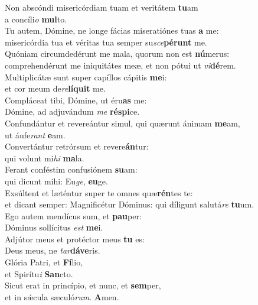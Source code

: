 \evenverse Non abscóndi misericórdiam tuam et veritátem \textbf{tu}am~\*\\
\evenverse a concíli\textit{o} \textbf{mul}to.\\
\oddverse Tu autem, Dómine, ne longe fácias miseratiónes tuas \textbf{a} me:~\*\\
\oddverse misericórdia tua et véritas tua semper su\textit{sce}\textbf{pé}\textbf{runt} me.\\
\evenverse Quóniam circumdedérunt me mala, quorum non est \textbf{nú}merus:~\*\\
\evenverse comprehendérunt me iniquitátes meæ, et non pótui ut \textit{vi}\textbf{dé}rem.\\
\oddverse Multiplicátæ sunt super capíllos cápitis \textbf{me}i:~\*\\
\oddverse et cor meum de\textit{re}\textbf{lí}\textbf{quit} me.\\
\evenverse Compláceat tibi, Dómine, ut éru\textbf{as} me:~\*\\
\evenverse Dómine, ad adjuvándum \textit{me} \textbf{ré}\textbf{spi}ce.\\
\oddverse Confundántur et revereántur simul, qui quærunt ánimam \textbf{me}am,~\*\\
\oddverse ut áufe\textit{rant} \textbf{e}am.\\
\evenverse Convertántur retrórsum et revere\textbf{án}tur:~\*\\
\evenverse qui volunt mi\textit{hi} \textbf{ma}la.\\
\oddverse Ferant conféstim confusiónem \textbf{su}am:~\*\\
\oddverse qui dicunt mihi: Eu\textit{ge}, \textbf{e}\textbf{u}ge.\\
\evenverse Exsúltent et læténtur super te omnes quæ\textbf{rén}tes te:~\*\\
\evenverse et dicant semper: Magnificétur Dóminus: qui díligunt salutá\textit{re} \textbf{tu}um.\\
\oddverse Ego autem mendícus sum, et \textbf{pau}per:~\*\\
\oddverse Dóminus sollícitus \textit{est} \textbf{me}i.\\
\evenverse Adjútor meus et protéctor meus \textbf{tu} es:~\*\\
\evenverse Deus meus, ne \textit{tar}\textbf{dá}\textbf{ve}ris.\\
\oddverse Glória Patri, et \textbf{Fí}lio,~\*\\
\oddverse et Spirítu\textit{i} \textbf{San}cto.\\
\evenverse Sicut erat in princípio, et nunc, et \textbf{sem}per,~\*\\
\evenverse et in sǽcula sæculó\textit{rum}. \textbf{A}men.\\
